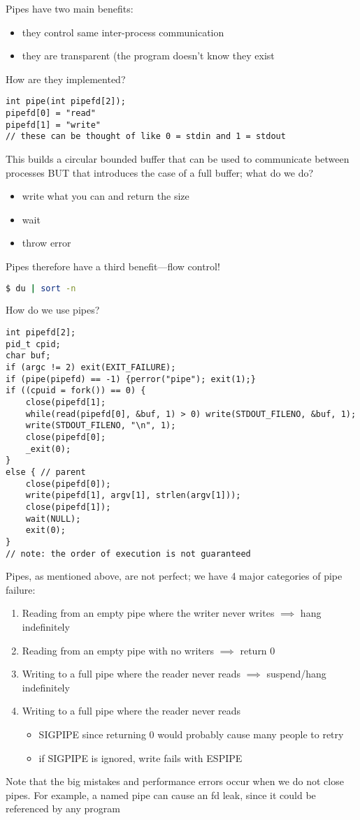 \documentclass[../../lecture_notes.tex]{subfiles}
\begin{document}
Pipes have two main benefits:
\begin{itemize}
\item they control same inter-process communication
\item they are transparent (the program doesn’t know they exist
\end{itemize}

How are they implemented?
\begin{lstlisting}
int pipe(int pipefd[2]);
pipefd[0] = "read"
pipefd[1] = "write"
// these can be thought of like 0 = stdin and 1 = stdout
\end{lstlisting}

This builds a circular bounded buffer that can be used to communicate between processes
BUT that introduces the case of a full buffer; what do we do?
\begin{itemize}
\item write what you can and return the size
\item wait
\item throw error
\end{itemize}

Pipes therefore have a third benefit—flow control!
\begin{lstlisting}[language=sh]
$ du | sort -n
\end{lstlisting}

How do we use pipes?
\begin{lstlisting}
int pipefd[2];
pid_t cpid;
char buf;
if (argc != 2) exit(EXIT_FAILURE);
if (pipe(pipefd) == -1) {perror("pipe"); exit(1);}
if ((cpuid = fork()) == 0) {
	close(pipefd[1];
	while(read(pipefd[0], &buf, 1) > 0) write(STDOUT_FILENO, &buf, 1);
	write(STDOUT_FILENO, "\n", 1);
	close(pipefd[0];
	_exit(0);
}
else { // parent
	close(pipefd[0]);
	write(pipefd[1], argv[1], strlen(argv[1]));
	close(pipefd[1]);
	wait(NULL);
	exit(0);
}
// note: the order of execution is not guaranteed 
\end{lstlisting}


Pipes, as mentioned above, are not perfect; we have 4 major categories of pipe failure:
\begin{enumerate}
\item Reading from an empty pipe where the writer never writes $\implies$ hang indefinitely
\item Reading from an empty pipe with no writers $\implies$ return 0
\item Writing to a full pipe where the reader never reads $\implies$ suspend/hang indefinitely
\item Writing to a full pipe where the reader never reads \begin{itemize}
	\item SIGPIPE since returning 0 would probably cause many people to retry
	\item if SIGPIPE is ignored, write fails with ESPIPE
	\end{itemize}
\end{enumerate}
Note that the big mistakes and performance errors occur when we do not close pipes. For example, a named pipe can cause an fd leak, since it could be referenced by any program
\end{document}
